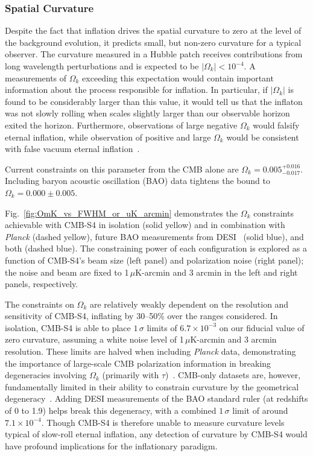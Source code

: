 \subsubsection{Spatial Curvature}
\label{sec:curvature}

Despite the fact that inflation drives the spatial curvature to zero at the level of the background evolution, it predicts small, but non-zero curvature for a typical observer. The curvature measured in a Hubble patch receives contributions from long wavelength perturbations and is expected to be $|\Omega_k|<10^{-4}$. A measurements of $\Omega_k$ exceeding this expectation would contain important information about the process responsible for inflation. In particular, if $|\Omega_k|$ is found to be considerably larger than this value, it would tell us that the inflaton was not slowly rolling when scales slightly larger than our observable horizon exited the horizon. Furthermore, observations of large negative $\Omega_k$ would falsify eternal inflation, while observation of positive and large $\Omega_k$ would be consistent with false vacuum eternal inflation~\cite{Guth:2012ww,Kleban:2012ph}.

Current constraints on this parameter from the CMB alone are $\Omega_k= 0.005^{+0.016}_{-0.017}$. Including baryon acoustic oscillation (BAO) data tightens the bound to $\Omega_k=0.000\pm0.005$.%

Fig.~\ref{fig:OmK_vs_FWHM_or_uK_arcmin} demonstrates the $\Omega_k$ constraints achievable with CMB-S4 in isolation (solid yellow) and in combination with {\it Planck\/} (dashed yellow), future BAO measurements from DESI~\cite{Font-Ribera:2013rwa} (solid blue), and both (dashed blue). The constraining power of each configuration is explored as a function of CMB-S4's beam size (left panel) and polarization noise (right panel); the noise and beam are fixed to 1$\,\mu$K-arcmin and 3 arcmin in the left and right panels, respectively.

The constraints on $\Omega_k$ are relatively weakly dependent on the resolution and sensitivity of CMB-S4, inflating by 30--50\% over the ranges considered. In isolation, CMB-S4 is able to place $1\,\sigma$ limits of $6.7\times10^{-3}$ on our fiducial value of zero curvature, assuming a white noise level of 1$\,\mu$K-arcmin and 3 arcmin resolution. These limits are halved when including {\it Planck\/} data, demonstrating the importance of large-scale CMB polarization information in breaking degeneracies involving $\Omega_k$ (primarily with $\tau$)~\cite{Leonard:2016evk}. CMB-only datasets are, however, fundamentally limited in their ability to constrain curvature by the geometrical degeneracy~\cite{Zaldarriaga:1997ch,Bond:1997wr}. Adding DESI measurements of the BAO standard ruler (at redshifts of 0 to 1.9) helps break this degeneracy, with a combined $1\,\sigma$ limit of around $7.1\times10^{-4}$. Though CMB-S4 is therefore unable to measure curvature levels typical of slow-roll eternal inflation, any detection of curvature by CMB-S4 would have profound implications for the inflationary paradigm.

